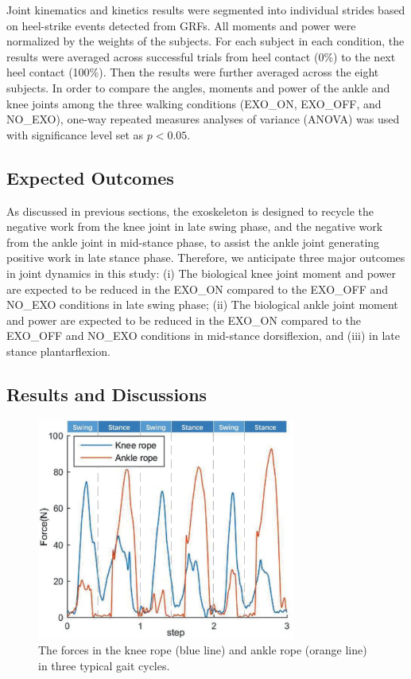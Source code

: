 \documentclass[twocolumn,cleanfoot,10pt]{asme2ej}
\begin{document}
Joint kinematics and kinetics results were segmented into individual strides based on heel-strike events detected from GRFs.
All moments and power were normalized by the weights of the subjects.
For each subject in each condition, the results were averaged across successful trials from heel contact (0\%) to the next heel contact (100\%).
Then the results were further averaged across the eight subjects.
In order to compare the angles, moments and power of the ankle and knee joints among the three walking conditions (EXO\_ON, EXO\_OFF, and NO\_EXO), one-way repeated measures analyses of variance (ANOVA) was used with significance level set as $p<0.05$.

\subsection{Expected Outcomes}

As discussed in previous sections, the exoskeleton is designed to recycle the negative work from the knee joint in late swing phase, and the negative work from the ankle joint in mid-stance phase, to assist the ankle joint generating positive work in late stance phase.
Therefore, we anticipate three major outcomes in joint dynamics in this study:
(i) The biological knee joint moment and power are expected to be reduced in the EXO\_ON compared to the EXO\_OFF and NO\_EXO conditions in late swing phase;
(ii) The biological ankle joint moment and power are expected to be reduced in the EXO\_ON compared to the EXO\_OFF and NO\_EXO conditions in mid-stance dorsiflexion, and (iii) in late stance plantarflexion.

\subsection{Results and Discussions}

\begin{figure}[b]
	\centering
	\includegraphics[width=8.5cm]{forces.eps}
	\caption{The forces in the knee rope (blue line) and ankle rope (orange line) in three typical gait cycles.}
	\label{fig:force}
\end{figure}
\end{document}
